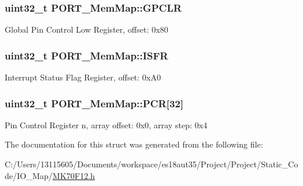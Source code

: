 \subsubsection[{G\+P\+C\+L\+R}]{\setlength{\rightskip}{0pt plus 5cm}uint32\+\_\+t P\+O\+R\+T\+\_\+\+Mem\+Map\+::\+G\+P\+C\+L\+R}\label{struct_p_o_r_t___mem_map_a837c289643f8cec958b1f01c086b558a}
Global Pin Control Low Register, offset\+: 0x80 \hypertarget{struct_p_o_r_t___mem_map_a53c86a08f430dc915a312efe74ba83e6}{}
\subsubsection[{I\+S\+F\+R}]{\setlength{\rightskip}{0pt plus 5cm}uint32\+\_\+t P\+O\+R\+T\+\_\+\+Mem\+Map\+::\+I\+S\+F\+R}\label{struct_p_o_r_t___mem_map_a53c86a08f430dc915a312efe74ba83e6}
Interrupt Status Flag Register, offset\+: 0x\+A0 \hypertarget{struct_p_o_r_t___mem_map_a1c54a8f1741fade8daf28198fee43ddd}{}
\subsubsection[{P\+C\+R}]{\setlength{\rightskip}{0pt plus 5cm}uint32\+\_\+t P\+O\+R\+T\+\_\+\+Mem\+Map\+::\+P\+C\+R\mbox{[}32\mbox{]}}\label{struct_p_o_r_t___mem_map_a1c54a8f1741fade8daf28198fee43ddd}
Pin Control Register n, array offset\+: 0x0, array step\+: 0x4 

The documentation for this struct was generated from the following file\+:\begin{DoxyCompactItemize}
\item 
C\+:/\+Users/13115605/\+Documents/workspace/es18aut35/\+Project/\+Project/\+Static\+\_\+\+Code/\+I\+O\+\_\+\+Map/\hyperlink{_m_k70_f12_8h}{M\+K70\+F12.\+h}\end{DoxyCompactItemize}
